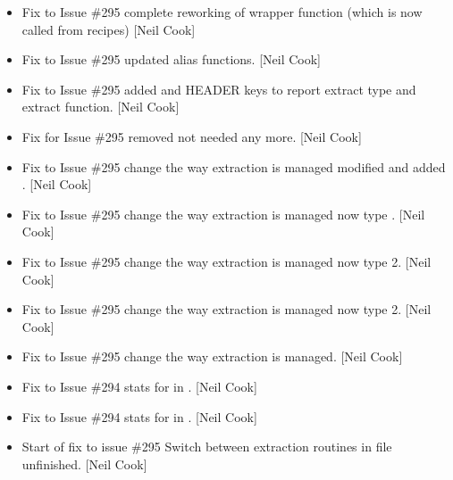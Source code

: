 \documentclass[a4paper,10pt,english]{report}
\begin{document}
\begin{itemize}
\item {} 
Fix to Issue \#295 \sphinxhyphen{} complete reworking of wrapper function (which is
now called from recipes) {[}Neil Cook{]}

\item {} 
Fix to Issue \#295 \sphinxhyphen{} updated alias functions. {[}Neil Cook{]}

\item {} 
Fix to Issue \#295 \sphinxhyphen{} added  and  HEADER keys to
report extract type and extract function. {[}Neil Cook{]}

\item {} 
Fix for Issue \#295 \sphinxhyphen{} removed  \sphinxhyphen{} not needed any
more. {[}Neil Cook{]}

\item {} 
Fix to Issue \#295 \sphinxhyphen{} change the way extraction is managed \sphinxhyphen{} modified
 and added . {[}Neil Cook{]}

\item {} 
Fix to Issue \#295 \sphinxhyphen{} change the way extraction is managed \sphinxhyphen{} now type
. {[}Neil Cook{]}

\item {} 
Fix to Issue \#295 \sphinxhyphen{} change the way extraction is managed \sphinxhyphen{} now type 2.
{[}Neil Cook{]}

\item {} 
Fix to Issue \#295 \sphinxhyphen{} change the way extraction is managed \sphinxhyphen{} now type 2.
{[}Neil Cook{]}

\item {} 
Fix to Issue \#295 \sphinxhyphen{} change the way extraction is managed. {[}Neil Cook{]}

\item {} 
Fix to Issue \#294 \sphinxhyphen{} stats for  in .
{[}Neil Cook{]}

\item {} 
Fix to Issue \#294 \sphinxhyphen{} stats for  in .
{[}Neil Cook{]}

\item {} 
Start of fix to issue \#295 \sphinxhyphen{} Switch between extraction routines in
 file \sphinxhyphen{} unfinished. {[}Neil Cook{]}


\end{itemize}
\end{document}
